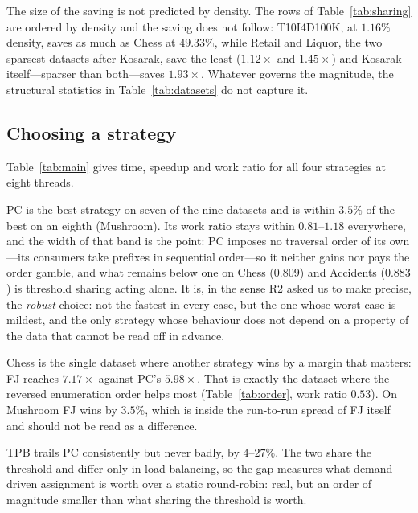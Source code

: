 \documentclass[pdflatex,sn-vancouver-num]{sn-jnl}
\theoremstyle{thmstyleone}%
\theoremstyle{thmstyletwo}%
\theoremstyle{thmstylethree}%
\begin{document}
The size of the saving is not predicted by density. The rows of
Table~\ref{tab:sharing} are ordered by density and the saving does not
follow: T10I4D100K, at $1.16\%$ density, saves as much as Chess at
$49.33\%$, while Retail and Liquor, the two sparsest datasets after Kosarak, save
the least ($1.12\times$ and $1.45\times$) and Kosarak itself---sparser
than both---saves $1.93\times$. Whatever governs the magnitude, the structural
statistics in Table~\ref{tab:datasets} do not capture it.
 
\subsection{Choosing a strategy}\label{subsec:choice}
 
Table~\ref{tab:main} gives time, speedup and work ratio for all four
strategies at eight threads.
 
PC is the best strategy on seven of the nine datasets and is within
$3.5\%$ of the best on an eighth (Mushroom). Its work ratio stays within $0.81$--$1.18$ everywhere, and the width of
that band is the point: PC imposes no traversal order of its own---its
consumers take prefixes in sequential order---so it neither gains nor
pays the order gamble, and what remains below one on Chess
($0.809$) and Accidents ($0.883$) is threshold sharing acting alone. It is, in the sense
R2 asked us to make precise, the \emph{robust} choice: not the fastest
in every case, but the one whose worst case is mildest, and the only
strategy whose behaviour does not depend on a property of the data that
cannot be read off in advance.
 
Chess is the single dataset where another strategy wins by a margin that
matters: FJ reaches $7.17\times$ against PC's $5.98\times$. That is
exactly the dataset where the reversed enumeration order helps most
(Table~\ref{tab:order}, work ratio $0.53$). On Mushroom FJ wins by
$3.5\%$, which is inside the run-to-run spread of FJ itself and should
not be read as a difference.
 
TPB trails PC consistently but never badly, by $4$--$27\%$. The two share
the threshold and differ only in load balancing, so the gap measures what
demand-driven assignment is worth over a static round-robin: real, but an
order of magnitude smaller than what sharing the threshold is worth.
 
\end{document}
